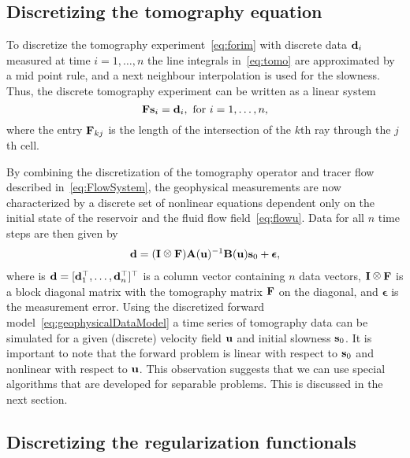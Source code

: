 \documentclass[english]{siamltex}
\newcommand {\bu}   { {\bf u} }          			%
\newcommand {\bfd}   { {\bf d} }
\newcommand {\bfs}   { {\bf s} }
\newcommand {\bfu}   { {\bf u} }
\newcommand{\bA}  { {\bf A} }      %
\newcommand{\bB}  { {\bf B} }      %
\newcommand{\bI}  { {\bf I} }      %
\newcommand{\bF}  { {\bf F} }      %
\def\kronecker{\raisebox{1pt}{\ensuremath{\:\otimes\:}}}
\begin{document}
\subsection{Discretizing the tomography equation} %
\label{sub:push_forward_tomography_data}
To discretize the tomography experiment~\eqref{eq:forim} with discrete data $\bfd_i$ measured at time $i=1,\ldots,n$ the line integrals in~\eqref{eq:tomo} are approximated  by a mid point rule, and  a next neighbour interpolation is used for the slowness.
Thus, the discrete tomography experiment can be written as a linear system
\begin{equation}
 	\bF{\bfs_i} = \bfd_i, \text{ for } i=1,\ldots,n,
\label{eq:distomo}
\end{equation}
where the entry $\bF_{kj}$ is the length of the intersection of the $k$th ray through the $j$th cell.

\bigskip

By combining the discretization of the tomography operator and tracer flow described in~\eqref{eq:FlowSystem}, the geophysical measurements are now characterized by a discrete set of nonlinear equations dependent only on the initial state of the reservoir and the fluid flow field~\eqref{eq:flowu}. Data for all $n$ time steps are then given by
\begin{eqnarray}\label{eq:geophysicalDataModel}
	\bfd =  (\bI \kronecker \bF)  \bA(\bu)^{-1} \bB(\bu) \bfs_0 + {\boldsymbol \epsilon},
\end{eqnarray}
where is $\bfd = [\bfd_{1}^{\top},\ldots,\bfd_{n}^{\top}]^{\top}$ is a column vector containing  $n$ data vectors, ${\bf I} \kronecker\bF$ is a block diagonal matrix with the tomography matrix $\bF$ on the diagonal, and $ {\boldsymbol \epsilon}$ is the measurement error. Using the discretized forward model~\eqref{eq:geophysicalDataModel} a time series of tomography data can be simulated for a given (discrete) velocity field $\bfu$ and initial slowness $\bfs_{0}$. 
It is important to note that the forward problem is linear with respect to $\bfs_{0}$ and nonlinear with respect to $\bfu$. This
observation suggests that we can use special algorithms that are developed for separable problems. This is discussed
in the next section.




\subsection{Discretizing the regularization functionals} %
\label{sub:discretizing_the_regularization_functionals}
\end{document}
